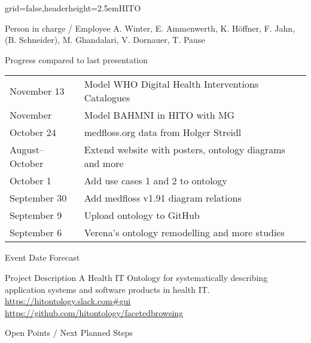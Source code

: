 \documentclass[]{kiesgrube}
\begin{document}
\begin{poster}%
{grid=false,headerheight=2.5em}{}{HITO}{}

\begin{posterbox}[name=person,column=0,row=0]{Person in charge / Employee}
A. Winter, E. Ammenwerth, K. Höffner, F. Jahn, (B. Schneider), M. Ghandalari, V. Dornauer, T. Pause
\end{posterbox}
\begin{posterbox}[name=progress,below=person]{Progress compared to last presentation}
\begin{tabulary}{\columnwidth}{lL}
November 13	&Model WHO Digital Health Interventions Catalogues\\
November	&Model BAHMNI in HITO with MG\\
October 24	&medfloss.org data from Holger Streidl\\
August--October	&Extend website with posters, ontology diagrams and more\\
October 1	&Add use cases 1 and 2 to ontology\\
September 30	&Add medfloss v1.91 diagram relations \\
September 9	&Upload ontology to GitHub\\
September 6	&Verena's ontology remodelling and more studies\\
\end{tabulary}
\end{posterbox}
\begin{posterbox}[name=event,below=progress]{Event Date Forecast}
\end{posterbox}
\begin{posterbox}[name=description,column=1,row=0]{Project Description}
A Health IT Ontology for systematically describing application systems and software products in health IT.\\
\url{https://hitontology.slack.com#gui}\\
\url{https://github.com/hitontology/facetedbrowsing}
\end{posterbox}
\begin{posterbox}[name=open,column=1,below=description]{Open Points / Next Planned Steps}

\end{posterbox}
\end{poster}
\end{document}
